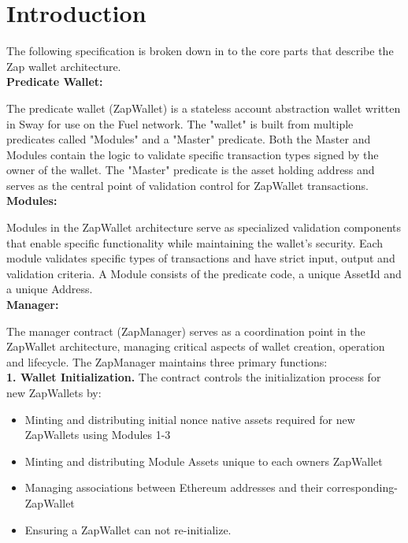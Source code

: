 \section{Introduction}
\label{sec:introduction}

The following specification is broken down in to the core parts that describe the Zap wallet architecture. \\

\textbf{Predicate Wallet:}\

The predicate wallet (ZapWallet) is a stateless account abstraction wallet written in Sway for use on the Fuel network. The "wallet" is built from multiple
predicates called "Modules" and a "Master" predicate. Both the Master and Modules contain the logic to validate specific transaction
types signed by the owner of the wallet. The "Master" predicate is the asset holding address and serves
as the central point of validation control for ZapWallet transactions.\\

\textbf{Modules:}\

Modules in the ZapWallet architecture serve as specialized validation components that enable specific functionality while
maintaining the wallet's security. Each module validates specific types of transactions and have strict input, output and validation
criteria. A Module consists of the predicate code, a unique AssetId and a unique Address. \\

\textbf{Manager:}\

The manager contract (ZapManager) serves as a coordination point in the ZapWallet architecture, managing critical aspects of wallet
creation, operation and lifecycle. The ZapManager maintains three primary functions: \\

\textbf{1. Wallet Initialization.} The contract controls the initialization process for new ZapWallets by:
\begin{itemize}
    \item Minting and distributing initial nonce native assets required for new ZapWallets using Modules 1-3
    \item Minting and distributing Module Assets unique to each owners ZapWallet
    \item Managing associations between Ethereum addresses and their corresponding-ZapWallet
    \item Ensuring a ZapWallet can not re-initialize.
\end{itemize}

